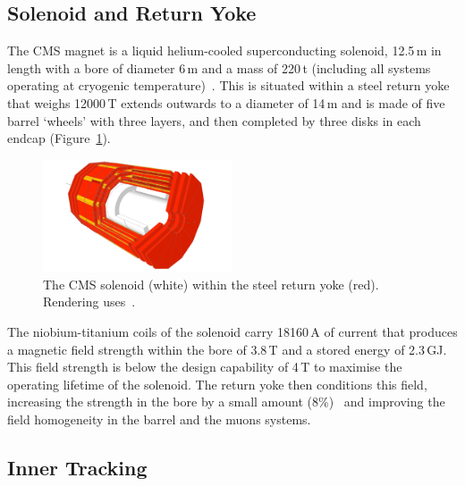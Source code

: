 \subsection{Solenoid and Return Yoke}

The CMS magnet is a liquid helium-cooled superconducting solenoid, 12.5\,m in length with a bore of diameter 6\,m and a mass of 220\,t (including all systems operating at cryogenic temperature)~\cite{CMSPhysics}. 
This is situated within a steel return yoke~\cite{Yoke} that weighs 12000\,T extends outwards to a diameter of 14\,m and is made of five barrel `wheels' with three layers, and then completed by three disks in each endcap (Figure~\ref{fig:apparatus:solenoid_yoke}).
\begin{figure}[h!]
    \centering
    \includegraphics[width=0.5\textwidth]{figures/apparatus/solenoid_yoke.pdf}
    \caption{The CMS solenoid (white) within the steel return yoke (red). Rendering uses~\cite{SketchupCMS}.}
    \label{fig:apparatus:solenoid_yoke}
\end{figure}
The niobium-titanium coils of the solenoid carry 18160\,A of current that produces a magnetic field strength within the bore of 3.8\,T and a stored energy of 2.3\,GJ. 
This field strength is below the design capability of 4\,T to maximise the operating lifetime of the solenoid.
The return yoke then conditions this field, increasing the strength in the bore by a small amount (8\%)~\cite{Yoke} and improving the field homogeneity in the barrel and the muons systems. 


\subsection{Inner Tracking}

